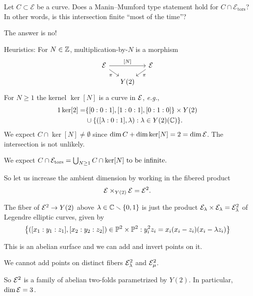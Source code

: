 \documentclass{beamer}
\begin{document}
\begin{frame}
  Let $C\subset \mathcal{E}$ be a curve. Does a
  Manin--Mumford type statement hold for $C\cap
  \mathcal{E}_{\mathrm{tors}}$? In other words, is this intersection
  finite ``most of the time''?

  The answer is \alert{no}! 

  Heuristics: For $N\in{\mathbb{Z}}$,  multiplication-by-$N$ is a
  morphism
  \begin{equation*}
    \begin{tikzcd}[ampersand replacement=\&,column sep=small, row sep=small] 
    \cE \arrow{dr}[swap]{\pi}  \arrow{rr}{[N]} \&  \& \cE\arrow{dl}{\pi}  \\
     \& Y(2)   
  \end{tikzcd}  
  \end{equation*}
  For $N\ge 1$ the kernel  $\ker[N]$ is a curve
  in ${\mathcal E}$, \textit{e.g.},
  \begin{alignat*}1
    \ker[2] = &\{[0:0:1],[1:0:1],[0:1:0]\}\times Y(2)\\
    &\cup
    \{([\lambda:0:1],\lambda) : \lambda \in Y(2)(\IC)\}.
  \end{alignat*}
  We expect $C\cap \ker[N]\not=\emptyset$
  since $\dim C + \dim \ker[N] = 2 = \dim {\mathcal E}$. The intersection is
  \alert{not} unlikely. 
  
  We expect $C\cap {\mathcal E}_{\mathrm{tors}} = \bigcup_{N\ge 1}C\cap \ker[N]
  \text{ to be infinite.}$
\end{frame}

\begin{frame}
  So let us increase the ambient dimension by  working
  in  the \alert{fibered product}
  $${\mathcal E}\times_{Y(2)}{\mathcal E}={\mathcal E}^2.$$

  \begin{example}
    The fiber of ${\mathcal E}^2\rightarrow Y(2)$ above  $\lambda\in
    {\mathbb{C}}\smallsetminus\{0,1\}$
    is just the product ${\mathcal E}_\lambda\times {\mathcal E}_\lambda={\mathcal E}^2_\lambda$ of Legendre
    elliptic curves, given by
    \begin{equation*}
      \bigl\{([x_1:y_1:z_1],[x_2:y_2:z_2]) \in{\mathbb{P}}^2\times{\mathbb{P}}^2 : y_i^2z_i =
      x_i(x_i-z_i)(x_i-\lambda z_i)\bigr\}      
    \end{equation*}

    This is an abelian surface and we can add and invert points on it.

    We \alert{cannot} add points on distinct fibers ${\mathcal E}^2_{\lambda}$
    and ${\mathcal E}^2_\mu$.

    So ${\mathcal E}^2$ is a family of abelian two-folds parametrized by $Y(2)$.
    In particular, $\dim {\mathcal E} = 3$. 
  \end{example}
\end{frame}
\end{document}
